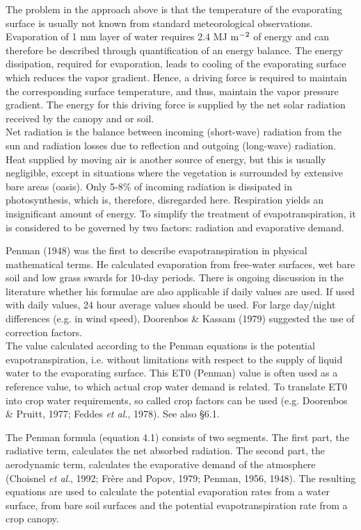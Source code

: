 \documentclass[11pt]{report}
\begin{document}
The problem in the approach above is that the temperature of the evaporating surface is
usually not known from standard meteorological observations. Evaporation  of 1 mm
layer of water requires 2.4 MJ m$^{{\rm -2}}$ of energy and can therefore be described through
quantification of an energy balance. The energy dissipation, required for evaporation,
leads to cooling of the evaporating surface which reduces the vapor gradient. Hence, a
driving force is required to maintain the corresponding surface temperature, and thus,
maintain the vapor pres\-sure gradient. The energy for this driving force is supplied by the
net solar radiation received by the canopy and or soil.\\
Net radiation is the balance between incoming (short-wave) radiation from the sun and
radiation losses due to reflection and outgoing (long-wave) radiation. Heat supplied by
moving air is another source of energy, but this is usually negligible, except in situations
where the vegetation is surrounded by extensive bare areas (oasis). Only 5-8\% of
incoming radiation is dissipated in photosynthesis, which is, therefore, disregarded here.
Respiration yields an insignificant amount of energy. To simplify the treatment of
evapotranspiration, it is considered to be governed by two factors: radiation and evaporative demand.

Penman (1948) was the first to describe evapotranspiration in physi\-cal mathematical
terms. He calculated evaporation from free-water surfaces, wet bare soil and low grass
swards for 10-day periods. There is ongoing discussion in the literature whether his
formulae are also applicable if daily values are used. If used with daily values, 24 hour
average values should be used. For large day/night differences (e.g. in wind speed),
Dooren\-bos \& Kassam (1979) suggested the use of correction factors.\\
The value calculated according to the Penman equations is the potential evapo\-{\nobreak}transpiration, i.e. without limitations with respect to the supply of liquid water to the
evaporating surface. This ET0 (Penman) value is often used as a reference value, to
which actual crop water demand is related. To translate ET0 into crop water require\-ments,
 so called crop factors can be used (e.g. Doorenbos \& Pruitt, 1977; Feddes {\it et al.\/},
1978). See also \S 6.1.

The Penman formula (equation 4.1) consists of two segments. The first part, the radiative
term, calculates the net absorbed radiation. The second part, the aerodynamic term,
calculates the evapora\-tive demand of the atmo\-sphere (Choisnel {\it et al\/}., 1992; Fr\`{e}re and
Popov, 1979; Penman, 1956, 1948). The resulting equations are used to calculate the
potential evapora\-tion rates from a water surface, from bare soil surfaces and the potential
evapotranspira\-tion rate from a crop canopy.
\end{document}
